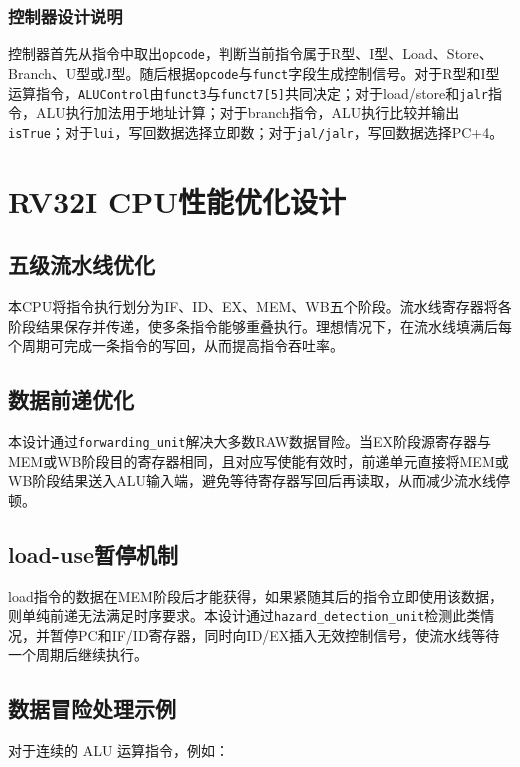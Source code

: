 \documentclass[UTF8,a4paper,12pt]{ctexart}
\newcommand{\code}[1]{\texttt{#1}}
\begin{document}
\subsubsection{控制器设计说明}

控制器首先从指令中取出\code{opcode}，判断当前指令属于R型、I型、Load、Store、Branch、U型或J型。随后根据\code{opcode}与\code{funct}字段生成控制信号。对于R型和I型运算指令，\code{ALUControl}由\code{funct3}与\code{funct7[5]}共同决定；对于load/store和\code{jalr}指令，ALU执行加法用于地址计算；对于branch指令，ALU执行比较并输出\code{isTrue}；对于\code{lui}，写回数据选择立即数；对于\code{jal/jalr}，写回数据选择PC+4。

\section{RV32I CPU性能优化设计}

\subsection{五级流水线优化}

本CPU将指令执行划分为IF、ID、EX、MEM、WB五个阶段。流水线寄存器将各阶段结果保存并传递，使多条指令能够重叠执行。理想情况下，在流水线填满后每个周期可完成一条指令的写回，从而提高指令吞吐率。

\subsection{数据前递优化}

本设计通过\code{forwarding\_unit}解决大多数RAW数据冒险。当EX阶段源寄存器与MEM或WB阶段目的寄存器相同，且对应写使能有效时，前递单元直接将MEM或WB阶段结果送入ALU输入端，避免等待寄存器写回后再读取，从而减少流水线停顿。

\subsection{load-use暂停机制}

load指令的数据在MEM阶段后才能获得，如果紧随其后的指令立即使用该数据，则单纯前递无法满足时序要求。本设计通过\code{hazard\_detection\_unit}检测此类情况，并暂停PC和IF/ID寄存器，同时向ID/EX插入无效控制信号，使流水线等待一个周期后继续执行。

\subsection{数据冒险处理示例}

对于连续的 ALU 运算指令，例如：
\end{document}
